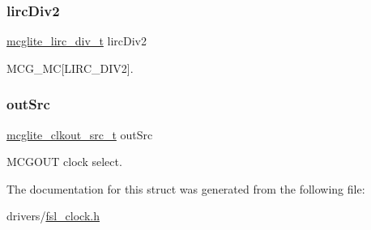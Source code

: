 \subsubsection{\texorpdfstring{lircDiv2}{lircDiv2}}
{\footnotesize\ttfamily \mbox{\hyperlink{group__clock_gaca07fe4bde2c34163d52f6f8507368ba}{mcglite\+\_\+lirc\+\_\+div\+\_\+t}} lirc\+Div2}

M\+C\+G\+\_\+\+MC\mbox{[}L\+I\+R\+C\+\_\+\+D\+I\+V2\mbox{]}. \mbox{\label{struct__mcglite__config_aaa8dafb0e23cd51917a168580f17b45a}} 
\subsubsection{\texorpdfstring{outSrc}{outSrc}}
{\footnotesize\ttfamily \mbox{\hyperlink{group__clock_ga102f26486150540dc286f6811c71d8ec}{mcglite\+\_\+clkout\+\_\+src\+\_\+t}} out\+Src}

M\+C\+G\+O\+UT clock select. 

The documentation for this struct was generated from the following file\+:\begin{DoxyCompactItemize}
\item 
drivers/\mbox{\hyperlink{fsl__clock_8h}{fsl\+\_\+clock.\+h}}\end{DoxyCompactItemize}
